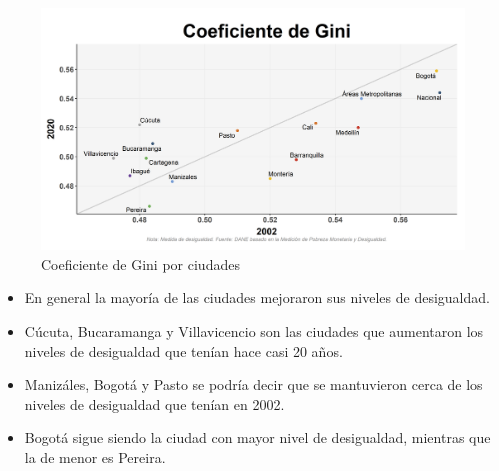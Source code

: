     \begin{figure}[H]
        \caption{Coeficiente de Gini por ciudades \label{map_result_2} }
        \begin{center}
        \includegraphics[width=\textwidth,keepaspectratio]{img/var_253_scatter_time.png}
        \end{center}
    \end{figure}
            \begin{itemize}
                    \item En general la mayoría de las ciudades mejoraron sus niveles de desigualdad.
                    \item Cúcuta, Bucaramanga y Villavicencio son las ciudades que aumentaron los niveles de desigualdad que tenían hace casi 20 años.
                    \item Manizáles, Bogotá y Pasto se podría decir que se mantuvieron cerca de los niveles de desigualdad que tenían en 2002.
                    \item Bogotá sigue siendo la ciudad con mayor nivel de desigualdad, mientras que la de menor es Pereira.
                    \end{itemize}

